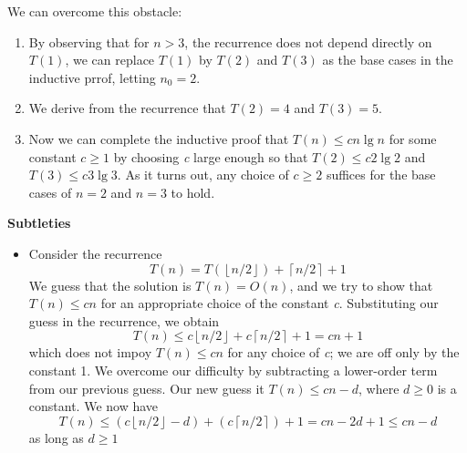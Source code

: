 \documentclass{report}
\begin{document}
\begin{itemize}
\begin{enumerate}
    \end{enumerate}
    We can overcome this obstacle:
    \begin{enumerate}
        \item By observing that for $n > 3$, the recurrence does not depend directly on $T(1)$, we can replace $T(1)$ by $T(2)$ and $T(3)$ as the base cases in the inductive prrof, letting $n_0 = 2$.
        \item We derive from the recurrence that $T(2) = 4$ and $T(3) = 5$.
        \item Now we can complete the inductive proof that $T(n) \leq cn \lg n$ for some constant $c \geq 1$ by choosing \textit{c} large enough so that $T(2) \leq c2 \lg 2$ and $T(3) \leq c3 \lg 3$. As it turns out, any choice of $c \geq 2$ suffices for the base cases of $n = 2$ and $n = 3$ to hold.
    \end{enumerate}
\end{itemize}
\textbf{Subtleties}
\begin{itemize}
    \item Consider the recurrence
    $$T(n) = T(\left \lfloor{n/2} \right \rfloor) + \left \lceil{n/2} \right \rceil + 1$$
    We guess that the solution is $T(n) = O(n)$, and we try to show that $T(n) \leq cn$ for an appropriate choice of the constant \textit{c}. Substituting our guess in the recurrence, we obtain
    $$T(n) \leq c \left \lfloor{n/2} \right \rfloor + c \left \lceil{n/2} \right \rceil + 1 = cn + 1$$
    which does not impoy $T(n) \leq cn$ for any choice of \textit{c}; we are off only by the constant 1. We overcome our difficulty by subtracting a lower-order term from our previous guess. Our new guess it $T(n) \leq cn - d$, where $d \geq 0$ is a constant. We now have
    $$T(n) \leq (c \left \lfloor{n/2} \right \rfloor - d) + (c \left \lceil{n/2} \right \rceil) + 1 = cn - 2d + 1 \leq cn - d$$
    as long as $d \geq 1$
\end{itemize}
\end{document}
